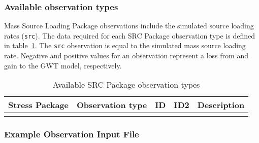 \vspace{5mm}
\subsubsection{Available observation types}
Mass Source Loading Package observations include the simulated source loading rates (\texttt{src}). The data required for each SRC Package observation type is defined in table~\ref{table:gwt-srcobstype}. The \texttt{src} observation is equal to the simulated mass source loading rate. Negative and positive values for an observation represent a loss from and gain to the GWT model, respectively.

\begin{longtable}{p{2cm} p{2.75cm} p{2cm} p{1.25cm} p{7cm}}
\caption{Available SRC Package observation types} \tabularnewline

\hline
\hline
\textbf{Stress Package} & \textbf{Observation type} & \textbf{ID} & \textbf{ID2} & \textbf{Description} \\
\hline
\endhead

\hline
\endfoot


\label{table:gwt-srcobstype}
\end{longtable}

\vspace{5mm}
\subsubsection{Example Observation Input File}

